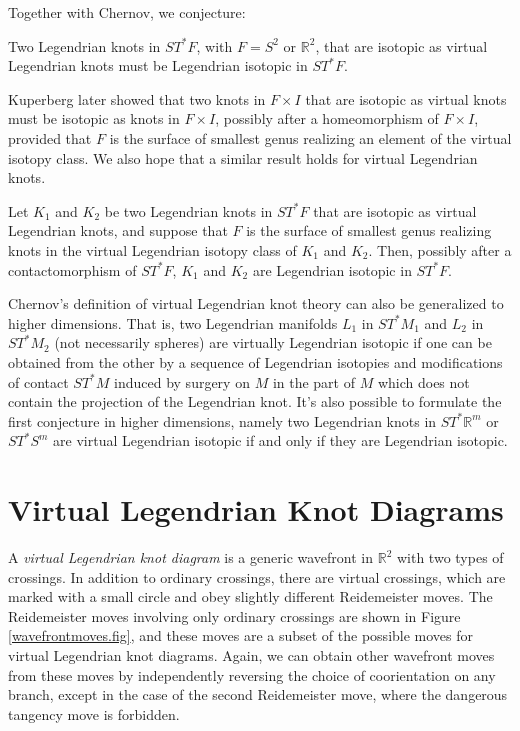 Together with Chernov, we conjecture:
\begin{conjec}  Two Legendrian knots in $ST^*F$, with $F=S^2$ or $\mathbb{R}^2$, that are isotopic as virtual Legendrian knots must be Legendrian isotopic in $ST^*F$.
\end{conjec}
  
Kuperberg \cite{Kuperberg} later showed that two knots in $F\times I$ that are isotopic as virtual knots must be isotopic as knots in $F\times I$, possibly after a homeomorphism of $F\times I$, provided that $F$ is the surface of smallest genus realizing an element of the virtual isotopy class.  We also hope that a similar result holds for virtual Legendrian knots.

\begin{conjec} Let $K_1$ and $K_2$ be two Legendrian knots in $ST^*F$ that are isotopic as virtual Legendrian knots, and suppose that $F$ is the surface of smallest genus realizing knots in the virtual Legendrian isotopy class of $K_1$ and $K_2$.  Then, possibly after a contactomorphism of $ST^*F$, $K_1$ and $K_2$ are Legendrian isotopic in $ST^*F$.
\end{conjec}

Chernov's definition of virtual Legendrian knot theory can also be generalized to higher dimensions.  That is, two Legendrian manifolds $L_1$ in $ST^*M_1$ and $L_2$ in $ST^*M_2$ (not necessarily spheres) are virtually Legendrian isotopic if one can be obtained from the other by a sequence of Legendrian isotopies and modifications of contact $ST^*M $ induced by surgery on $M$ in the part of $M$ which does not contain the projection of the Legendrian knot.  It's also possible to formulate the first conjecture in higher dimensions, namely two Legendrian knots in $ST^*\mathbb{R}^m$ or $ST^*S^m$ are virtual Legendrian isotopic if and only if they are Legendrian isotopic.

\section{Virtual Legendrian Knot Diagrams}\label{diagrams}
A {\it virtual Legendrian knot diagram} is a generic wavefront in $\mathbb{R}^2$ with two types of crossings.  In addition to ordinary crossings, there are virtual crossings, which are marked with a small circle and obey slightly different Reidemeister moves.  The Reidemeister moves involving only ordinary crossings are shown in Figure \ref{wavefrontmoves.fig}, and these moves are a subset of the possible moves for virtual Legendrian knot diagrams.  Again, we can obtain other wavefront moves from these moves by independently reversing the choice of coorientation on any branch, except in the case of the second Reidemeister move, where the dangerous tangency move is forbidden.

